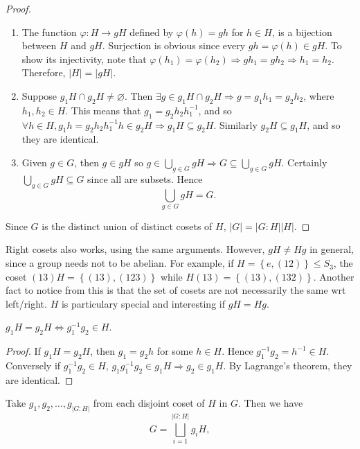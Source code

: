 \documentclass[a4paper]{article}
\begin{document}
    \begin{proof}
        \begin{enumerate}
            \item The function $ \varphi:H\to gH $ defined by $ \varphi(h)=gh $ for $h\in H$, is a bijection between $H$ and $gH$. Surjection is obvious since every $ gh=\varphi(h)\in gH $. To show its injectivity, note that $\varphi(h_1)=\varphi(h_2)\Rightarrow gh_1=gh_2 \Rightarrow h_1=h_2 $. Therefore, $ |H|=|gH|$.
            \item Suppose $ g_1H\cap g_2H\neq \varnothing $. Then $ \exists g\in g_1H\cap g_2H \Rightarrow g=g_1h_1=g_2h_2 $, where $h_1,h_2\in H$. This means that $ g_1=g_2h_2h_1^{-1} $, and so $ \forall h\in H, g_1h=g_2h_2h_1^{-1}h\in g_2H \Rightarrow g_1H \subseteq g_2H $. Similarly $ g_2H \subseteq g_1H $, and so they are identical.
            \item Given $g\in G$, then $ g\in gH $ so $ g\in \bigcup_{g\in G}gH \Rightarrow G \subseteq \bigcup_{g\in G}gH $. Certainly $ \bigcup_{g\in G}gH \subseteq G $ since all are subsets. Hence 
            \[
                \bigcup_{g\in G}gH=G
            .\]
        \end{enumerate}
        Since $G$ is the distinct union of distinct cosets of $H$, $|G|=|G:H||H|$.
    \end{proof}
    \begin{remark}
        Right cosets also works, using the same arguments. However, $ gH\neq Hg $ in general, since a group needs not to be abelian. For example, if $ H=\left\{ e,(12)\right\}\le S_3 $, the coset $ (13)H=\left\{ (13),(123)\right\} $ while $ H(13)=\left\{ (13),(132)\right\} $. Another fact to notice from this is that the set of cosets are not necessarily the same wrt left/right. $H$ is particulary special and interesting if $ gH=Hg $.
    \end{remark}
    \begin{proposition}\label{prop:3.4}
        $ g_1H=g_2H \Longleftrightarrow g_1^{-1}g_2\in H $.
    \end{proposition}
    \begin{proof}
        If $ g_1H=g_2H $, then $ g_1=g_2h $ for some $h\in H$. Hence $ g_1^{-1}g_2=h^{-1}\in H $. Conversely if $ g_1^{-1}g_2\in H $, $ g_1 g_1^{-1}g_2\in g_1H \Rightarrow g_2\in g_1H $. By Lagrange's theorem, they are identical.
    \end{proof}
    Take $ g_1,g_2,\dots,g_{|G:H|} $ from each disjoint coset of $H$ in $G$. Then we have 
    \[
        G=\bigsqcup_{i=1}^{|G:H|}g_iH
    ,\]
\end{document}
